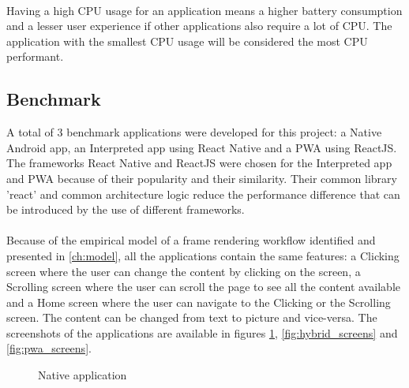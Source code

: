 \documentclass{kththesis}
\begin{document}
\paragraph{}
Having a high CPU usage for an application means a higher battery consumption and a lesser user experience if other applications also require a lot of CPU. The application with the smallest CPU usage will be considered the most CPU performant.

\subsection{Benchmark}
\label{method:benchmark}

A total of 3 benchmark applications were developed for this project: a Native Android app, an Interpreted app using React Native and a PWA using ReactJS. The frameworks React Native and ReactJS were chosen for the Interpreted app and PWA because of their popularity and their similarity. Their common library 'react' and common architecture logic reduce the performance difference that can be introduced by the use of different frameworks.

\paragraph{}
Because of the empirical model of a frame rendering workflow identified and presented in \autoref{ch:model}, all the applications contain the same features: a Clicking screen where the user can change the content by clicking on the screen, a Scrolling screen where the user can scroll the page to see all the content available and a Home screen where the user can navigate to the Clicking or the Scrolling screen. The content can be changed from text to picture and vice-versa. The screenshots of the applications are available in figures \ref{fig:native_screens}, \ref{fig:hybrid_screens} and \ref{fig:pwa_screens}.

\begin{figure}
    \centering
    \hfill
    \hfill
    \hfill
    \hfill
    \caption{Native application}
    \label{fig:native_screens}
\end{figure}
\end{document}
